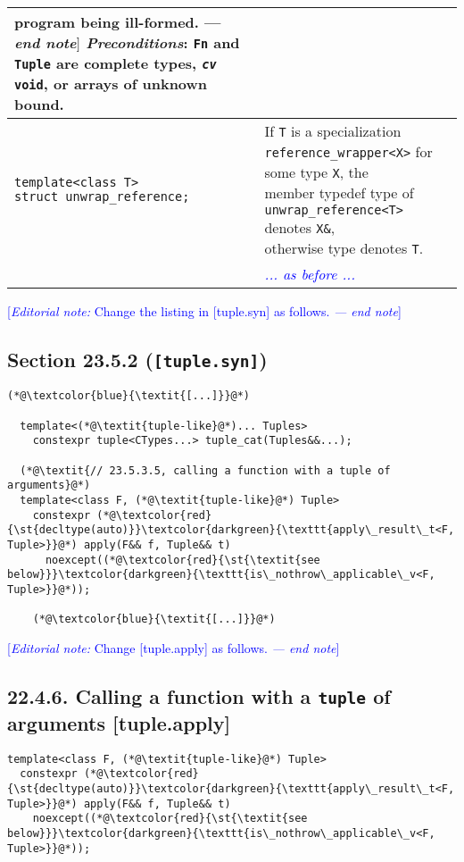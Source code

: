 \documentclass{article}
\begin{document}
\begin{center}
\begin{tabular}[t]{ | p{6cm} p{12cm} | }
{{                  program being ill-formed. --- \textit{end note}$]$ \\
                  \textit{Preconditions}: \texttt{Fn} and \texttt{Tuple} are complete types, \texttt{\textit{cv} void}, or arrays\\
                  of unknown bound.}} \\
    \hline
    \makecell[l]{\texttt{template<class T>} \\
                 \texttt{struct unwrap\_reference;}} &
    \makecell[l]{If \texttt{T} is a specialization \texttt{reference\_wrapper<X>} for some type \texttt{X}, the \\
                 member typedef type of \texttt{unwrap\_reference<T>} denotes \texttt{X\&}, \\
                 otherwise type denotes \texttt{T}.} \\
    \hline
    & \textcolor{blue}{\textit{... as before ...}} \\
    \hline
  \end{tabular}
\end{center}


\textcolor{blue}{[\textit{Editorial note:} Change the listing in [tuple.syn] as follows. \textit{--- end note}]}

\subsection*{Section 23.5.2 (\texttt{[tuple.syn]})}
\begin{lstlisting}[style=base]
    (*@\textcolor{blue}{\textit{[...]}}@*)

  template<(*@\textit{tuple-like}@*)... Tuples>
    constexpr tuple<CTypes...> tuple_cat(Tuples&&...);

  (*@\textit{// 23.5.3.5, calling a function with a tuple of arguments}@*)
  template<class F, (*@\textit{tuple-like}@*) Tuple>
    constexpr (*@\textcolor{red}{\st{decltype(auto)}}\textcolor{darkgreen}{\texttt{apply\_result\_t<F, Tuple>}}@*) apply(F&& f, Tuple&& t)
      noexcept((*@\textcolor{red}{\st{\textit{see below}}}\textcolor{darkgreen}{\texttt{is\_nothrow\_applicable\_v<F, Tuple>}}@*));

    (*@\textcolor{blue}{\textit{[...]}}@*)
\end{lstlisting}

\textcolor{blue}{[\textit{Editorial note:} Change [tuple.apply] as follows. \textit{--- end note}]}

\subsection*{22.4.6. Calling a function with a \texttt{tuple} of arguments [tuple.apply]}
\begin{lstlisting}
template<class F, (*@\textit{tuple-like}@*) Tuple>
  constexpr (*@\textcolor{red}{\st{decltype(auto)}}\textcolor{darkgreen}{\texttt{apply\_result\_t<F, Tuple>}}@*) apply(F&& f, Tuple&& t)
    noexcept((*@\textcolor{red}{\st{\textit{see below}}}\textcolor{darkgreen}{\texttt{is\_nothrow\_applicable\_v<F, Tuple>}}@*));
\end{lstlisting}
\end{document}
